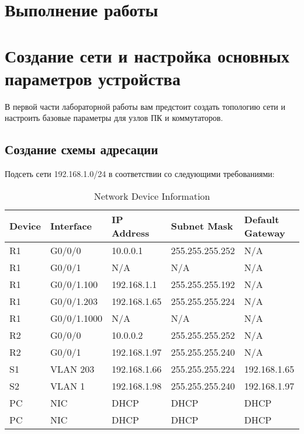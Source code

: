 \section*{\LARGE Выполнение работы}


\section{Создание сети и настройка основных параметров устройства}
В первой части лабораторной работы вам предстоит создать топологию сети и настроить базовые
параметры для узлов ПК и коммутаторов.

\subsection{Создание схемы адресации}
Подсеть сети 192.168.1.0/24 в соответствии со следующими требованиями:

\begin{table}[htbp]
    \centering
    \caption{Network Device Information}
    \label{tab:network_devices}
    \begin{tabular}{|l|l|l|l|l|}
        \hline
        \textbf{Device} & \textbf{Interface} & \textbf{IP Address}
        & \textbf{Subnet Mask} & \textbf{Default Gateway} \\ \hline
        R1 & G0/0/0 & 10.0.0.1 & 255.255.255.252 & N/A \\ \hline
        R1 & G0/0/1 & N/A & N/A & N/A \\ \hline
        R1 & G0/0/1.100 & 192.168.1.1 & 255.255.255.192 & N/A \\ \hline
        R1 & G0/0/1.203 & 192.168.1.65 & 255.255.255.224 & N/A \\ \hline
        R1 & G0/0/1.1000 & N/A & N/A & N/A \\ \hline
        R2 & G0/0/0 & 10.0.0.2 & 255.255.255.252 & N/A \\ \hline
        R2 & G0/0/1 & 192.168.1.97 & 255.255.255.240 & N/A \\ \hline
        S1 & VLAN 203 & 192.168.1.66 & 255.255.255.224 & 192.168.1.65 \\ \hline
        S2 & VLAN 1 & 192.168.1.98 & 255.255.255.240 & 192.168.1.97 \\ \hline
        PC & NIC & DHCP & DHCP & DHCP \\ \hline
        PC & NIC & DHCP & DHCP & DHCP \\ \hline
    \end{tabular}
\end{table}

